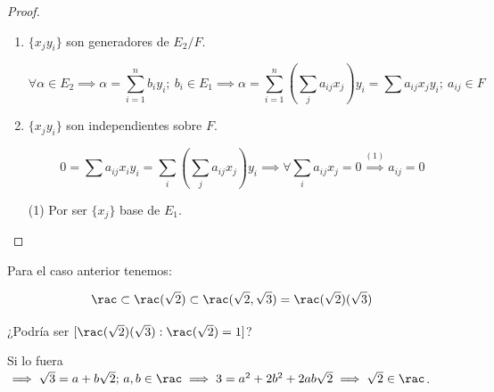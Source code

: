 \documentclass{apuntes}
\begin{document}
\begin{proof}
\begin{enumerate}
\item $\{x_jy_i\}$ son generadores de $E_2 / F$.

$$\forall \alpha \in E_2 \implies \alpha = \sum_{i=1}^n b_iy_i; \ b_i\in E_1 \implies \alpha = \sum_{i=1}^n \left(\sum_j a_{ij}x_j\right) y_i = \sum a_{ij}x_jy_i; \ a_{ij}\in F$$

\item $\{x_jy_i\}$ son independientes sobre $F$.

\[0 = \sum a_{ij}x_iy_i = \sum_i \left(\sum_j a_{ij}x_j\right)y_i \implies \forall \sum_i a_{ij}x_j = 0 \overset{(1)}{\implies} a_{ij} = 0
\]

(1) Por ser $\{x_j\}$ base de $E_1$.
\end{enumerate}
\end{proof}


Para el caso anterior tenemos:

\[
\rac \subset \rac(\sqrt{2}) \subset \rac(\sqrt{2},\sqrt{3}) = \rac(\sqrt{2})(\sqrt{3})
\]

¿Podría ser $[\rac(\sqrt{2})(\sqrt{3}): \rac(\sqrt{2}) = 1 ]$?

Si lo fuera $\implies \sqrt{3} = a+b\sqrt{2} ;\, a,b\in\rac \implies 3=a^2+2b^2+2ab\sqrt{2} \implies \sqrt{2}\in \rac$.
\end{document}
